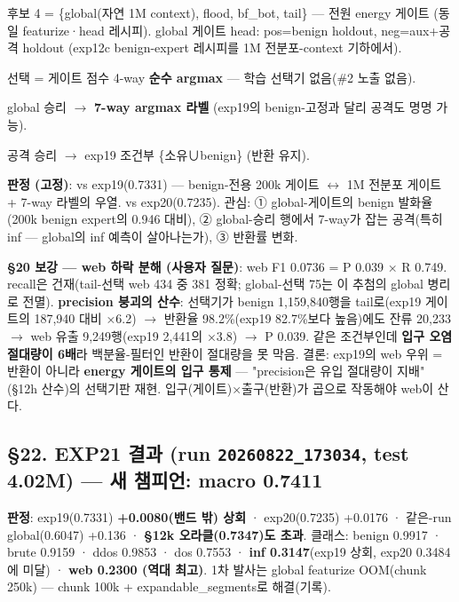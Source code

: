 \par\noindent \textbullet\enspace 후보 4 =\allowbreak{} \{global(자연 1M context), flood, bf\_\allowbreak{}bot, tail\} — 전원 energy 게이트 (동일 featurize·head 레시피). global 게이트 head: pos=\allowbreak{}benign holdout, neg=\allowbreak{}aux+\allowbreak{}공격 holdout (exp12c benign-expert 레시피를 1M 전분포-context 기하에서).


\par\noindent \textbullet\enspace 선택 =\allowbreak{} 게이트 점수 4-way \textbf{순수 argmax} — 학습 선택기 없음(\#2 노출 없음).


\par\noindent \textbullet\enspace global 승리  \ensuremath{\rightarrow}  \textbf{7-way argmax 라벨} (exp19의 benign-고정과 달리 공격도 명명 가능).


\par\noindent \textbullet\enspace 공격 승리  \ensuremath{\rightarrow}  exp19 조건부 \{소유∪benign\} (반환 유지).


\textbf{판정 (고정)}: vs exp19(0.7331) — benign-전용 200k 게이트  \ensuremath{\leftrightarrow}  1M 전분포 게이트 +\allowbreak{} 7-way 라벨의 우열. vs exp20(0.7235). 관심: ① global-게이트의 benign 발화율(200k benign expert의 0.946 대비), ② global-승리 행에서 7-way가 잡는 공격(특히 inf — global의 inf 예측이 살아나는가), ③ 반환률 변화.

\textbf{§20 보강 — web 하락 분해 (사용자 질문)}: web F1 0.0736 =\allowbreak{} P 0.039 × R 0.749. recall은 건재(tail-선택 web 434 중 381 정확; global-선택 75는 이 추첨의 global 병리로 전멸). \textbf{precision 붕괴의 산수}: 선택기가 benign 1,159,840행을 tail로(exp19 게이트의 187,940 대비 ×6.2)  \ensuremath{\rightarrow}  반환율 98.2\%(exp19 82.7\%보다 높음)에도 잔류 20,233  \ensuremath{\rightarrow}  web 유출 9,249행(exp19 2,441의 ×3.8)  \ensuremath{\rightarrow}  P 0.039. 같은 조건부인데 \textbf{입구 오염 절대량이 6배}라 백분율-필터인 반환이 절대량을 못 막음. 결론: exp19의 web 우위 =\allowbreak{} 반환이 아니라 \textbf{energy 게이트의 입구 통제} — "precision은 유입 절대량이 지배"(§12h 산수)의 선택기판 재현. 입구(게이트)×출구(반환)가 곱으로 작동해야 web이 산다.

\subsection{§22. EXP21 결과 (run \texttt{20260822\allowbreak{}\_\allowbreak{}\allowbreak{}173034}, test 4.02M) — \textbf{새 챔피언: macro 0.7411}}
\textbf{판정}: exp19(0.7331) \textbf{+\allowbreak{}0.0080(밴드 밖) 상회} · exp20(0.7235) +\allowbreak{}0.0176 · 같은-run global(0.6047) +\allowbreak{}0.136 · \textbf{§12k 오라클(0.7347)도 초과}. 클래스: benign 0.9917 · brute 0.9159 · ddos 0.9853 · dos 0.7553 · \textbf{inf 0.3147}(exp19 상회, exp20 0.3484에 미달) · \textbf{web 0.2300 (역대 최고)}. 1차 발사는 global featurize OOM(chunk 250k) — chunk 100k +\allowbreak{} expandable\_\allowbreak{}segments로 해결(기록).

